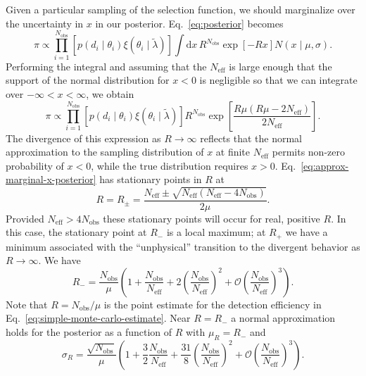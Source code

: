 \documentclass[modern]{aastex62}
\newcommand{\dd}{\mathrm{d}}
\newcommand{\Neff}{N_\mathrm{eff}}
\newcommand{\Nobs}{N_\mathrm{obs}}
\begin{document}
Given a particular sampling of the selection function, we should marginalize
over the uncertainty in $x$ in our posterior.  Eq.\ \eqref{eq:posterior} becomes
%
\begin{equation}
  \label{eq:posterior-integrated}
    \pi \propto \prod_{i = 1}^{\Nobs} \left[ p\left( d_i \mid \theta_i \right) \xi\left( \theta_i \mid \tilde{\lambda} \right) \right] \int \dd x \, R^{\Nobs} \exp\left[ -R x \right] N\left( x \mid \mu, \sigma\right).
\end{equation}
%
Performing the integral and assuming that the $\Neff$ is large enough that the
support of the normal distribution for $x<0$ is negligible so that we can
integrate over $-\infty < x < \infty$, we obtain
%
\begin{equation}
  \label{eq:approx-marginal-x-posterior}
  \pi \propto \prod_{i = 1}^{\Nobs} \left[ p\left( d_i \mid \theta_i \right) \xi\left( \theta_i \mid \tilde{\lambda} \right) \right] R^{\Nobs} \exp\left[  \frac{R \mu \left( R\mu - 2 \Neff \right)}{2 \Neff} \right].
\end{equation}
%
The divergence of this expression as $R\to \infty$ reflects that the normal
approximation to the sampling distribution of $x$ at finite $\Neff$ permits
non-zero probability of $x < 0$, while the true distribution requires $x > 0$.
Eq.\ \eqref{eq:approx-marginal-x-posterior} has stationary points in $R$ at
%
\begin{equation}
  R = R_{\pm} = \frac{\Neff \pm \sqrt{\Neff \left( \Neff - 4 \Nobs \right)}}{2 \mu}.
\end{equation}
%
Provided $\Neff > 4 \Nobs$ these stationary points will occur for real, positive
$R$.  In this case, the stationary point at $R_{-}$ is a local maximum; at
$R_{+}$ we have a minimum associated with the ``unphysical'' transition to the
divergent behavior as $R\to \infty$.  We have
%
\begin{equation}
  R_{-} = \frac{\Nobs}{\mu} \left( 1 + \frac{\Nobs}{\Neff} + 2 \left( \frac{\Nobs}{\Neff} \right)^2 + \mathcal{O}\left( \frac{\Nobs}{\Neff} \right)^3 \right).
\end{equation}
%
Note that $R = \Nobs / \mu$ is the point estimate for the detection efficiency
in Eq.\ \eqref{eq:simple-monte-carlo-estimate}.  Near $R = R_{-}$ a normal
approximation holds for the posterior as a function of $R$ with $\mu_R = R_{-}$
and
%
\begin{equation}
  \sigma_R = \frac{\sqrt{\Nobs}}{\mu} \left( 1 + \frac{3}{2} \frac{\Nobs}{\Neff} + \frac{31}{8} \left( \frac{\Nobs}{\Neff} \right)^2 + \mathcal{O} \left( \frac{\Nobs}{\Neff} \right)^3 \right).
\end{equation}
\end{document}
